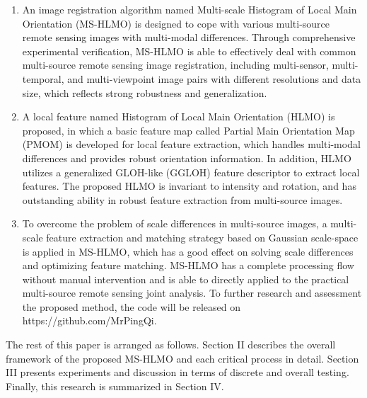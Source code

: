 \begin{enumerate}
\item{An image registration algorithm named Multi-scale Histogram of Local Main Orientation (MS-HLMO) is designed to cope with various multi-source remote sensing images with multi-modal differences. Through comprehensive experimental verification, MS-HLMO is able to effectively deal with common multi-source remote sensing image registration, including multi-sensor, multi-temporal, and multi-viewpoint image pairs with different resolutions and data size, which reflects strong robustness and generalization.}

\item{A local feature named Histogram of Local Main Orientation (HLMO) is proposed, in which a basic feature map called Partial Main Orientation Map (PMOM) is developed for local feature extraction, which handles multi-modal differences and provides robust orientation information. In addition, HLMO utilizes a generalized GLOH-like (GGLOH) feature descriptor to extract local features. The proposed HLMO is invariant to intensity and rotation, and has outstanding ability in robust feature extraction from multi-source images.}

\item{To overcome the problem of scale differences in multi-source images, a multi-scale feature extraction and matching strategy based on Gaussian scale-space is applied in MS-HLMO, which has a good effect on solving scale differences and optimizing feature matching. MS-HLMO has a complete processing flow without manual intervention and is able to directly applied to the practical multi-source remote sensing joint analysis. To further research and assessment the proposed method, the code will be released on https://github.com/MrPingQi.}
\end{enumerate}

The rest of this paper is arranged as follows. Section II describes the overall framework of the proposed MS-HLMO and each critical process in detail. Section III presents experiments and discussion in terms of discrete and overall testing. Finally, this research is summarized in Section IV. 